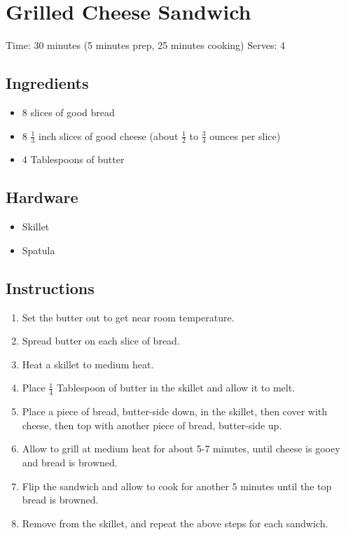 \section{Grilled Cheese Sandwich}
\label{grilledCheeseSandwich}
\setcounter{secnumdepth}{0}
Time: 30 minutes (5 minutes prep, 25 minutes cooking)
Serves: 4

\begin{multicols}{2}
\subsection*{Ingredients}
\begin{itemize}
    \item 8 slices of good bread
    \item 8 \( \frac{1}{3} \) inch slices of good cheese (about \( \frac{1}{2} \) to \( \frac{3}{4} \) ounces per slice)
    \item 4 Tablespoons of butter
\end{itemize}

\subsection*{Hardware}
\begin{itemize}
    \item Skillet
    \item Spatula
\end{itemize}
\clearpage

\subsection*{Instructions}
\begin{enumerate}
    \item Set the butter out to get near room temperature.
    \item Spread butter on each slice of bread.
    \item Heat a skillet to medium heat.
    \item Place \( \frac{1}{4} \) Tablespoon of butter in the skillet and allow it to melt.
    \item Place a piece of bread, butter-side down, in the skillet, then cover with cheese, then top with another piece of bread, butter-side up.
    \item Allow to grill at medium heat for about 5-7 minutes, until cheese is gooey and bread is browned.
    \item Flip the sandwich and allow to cook for another 5 minutes until the top bread is browned.
    \item Remove from the skillet, and repeat the above steps for each sandwich.
\end{enumerate}


\end{multicols}
